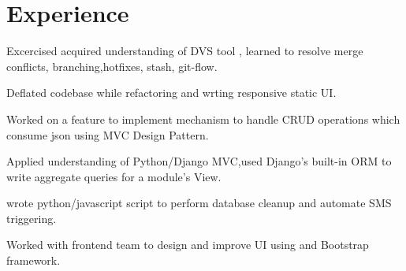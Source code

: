 \documentclass[hidelinks]{deedy-resume-openfont}
\renewcommand{\sectionsep}[0]{\vspace{8pt}}
\begin{document}
\begin{minipage}[t]{0.33\textwidth}





%

\end{minipage}
\hfill
\begin{minipage}[t]{0.66\textwidth}


\section{Experience}

\vspace{\topsep} %
\begin{tightemize}
\item  Excercised acquired understanding of DVS tool , learned to resolve merge conflicts, branching,hotfixes, stash, git-flow.
\item Deflated codebase while refactoring and wrting responsive static UI.
\item  Worked on a feature to implement mechanism to handle CRUD
operations which consume json using MVC Design Pattern.
\item Applied understanding of Python/Django MVC,used Django's built-in ORM to
  write aggregate queries for a module's View.
\item wrote python/javascript script to perform database cleanup and automate SMS triggering.
\end{tightemize}
\sectionsep

\begin{tightemize}
\item Worked with frontend team to design and improve UI using  and Bootstrap framework.
\end{tightemize}
\sectionsep


\end{minipage}
\end{document}
